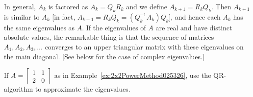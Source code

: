 \documentclass{ximera}
\begin{document}
In general, $A_{k}$ is factored as $A_{k} = Q_{k}R_{k}$ and we define $A_{k + 1} = R_{k}Q_{k}$. Then $A_{k + 1}$ is similar to $A_{k}$ [in fact, $A_{k+1} = R_{k}Q_{k} = (Q_{k}^{-1}A_{k})Q_{k}$], and hence each $A_{k}$ has the same eigenvalues as $A$. If the eigenvalues of $A$ are real and have distinct absolute values, the remarkable thing is that the sequence of matrices $A_{1}, A_{2}, A_{3}, \dots$ converges to an upper triangular matrix with these eigenvalues on the main diagonal. [See below for the case of complex eigenvalues.]
    
\begin{example}\label{QR-algortihm-2x2-025425}
If $A = \left[ \begin{array}{rr}
1 & 1 \\
2 & 0
\end{array}\right]$ as in Example~\ref{ex:2x2PowerMethod025326}, use the QR-algorithm to approximate the eigenvalues.
    

\end{example}
\end{document}
